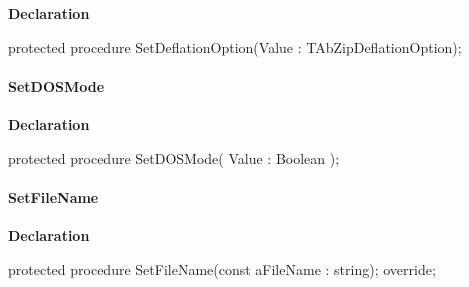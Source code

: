 \documentclass{report}
\newif\ifpdf
\begin{document}
\label{AbZipper.TAbCustomZipper-SetDeflationOption}
\begin{list}{}{
\setlength{\itemindent}{0cm}
\setlength{\listparindent}{0cm}
\setlength{\leftmargin}{\evensidemargin}
\addtolength{\leftmargin}{\tmplength}
\settowidth{\labelsep}{X}
\addtolength{\leftmargin}{\labelsep}
\setlength{\labelwidth}{\tmplength}
}
\item[\textbf{Declaration}\hfill]
\ifpdf
\begin{flushleft}
\fi
\begin{ttfamily}
protected procedure SetDeflationOption(Value : TAbZipDeflationOption);\end{ttfamily}

\ifpdf
\end{flushleft}
\fi

\end{list}
\paragraph*{SetDOSMode}\hspace*{\fill}

\label{AbZipper.TAbCustomZipper-SetDOSMode}
\begin{list}{}{
\setlength{\itemindent}{0cm}
\setlength{\listparindent}{0cm}
\setlength{\leftmargin}{\evensidemargin}
\addtolength{\leftmargin}{\tmplength}
\settowidth{\labelsep}{X}
\addtolength{\leftmargin}{\labelsep}
\setlength{\labelwidth}{\tmplength}
}
\item[\textbf{Declaration}\hfill]
\ifpdf
\begin{flushleft}
\fi
\begin{ttfamily}
protected procedure SetDOSMode( Value : Boolean );\end{ttfamily}

\ifpdf
\end{flushleft}
\fi

\end{list}
\paragraph*{SetFileName}\hspace*{\fill}

\label{AbZipper.TAbCustomZipper-SetFileName}
\begin{list}{}{
\setlength{\itemindent}{0cm}
\setlength{\listparindent}{0cm}
\setlength{\leftmargin}{\evensidemargin}
\addtolength{\leftmargin}{\tmplength}
\settowidth{\labelsep}{X}
\addtolength{\leftmargin}{\labelsep}
\setlength{\labelwidth}{\tmplength}
}
\item[\textbf{Declaration}\hfill]
\ifpdf
\begin{flushleft}
\fi
\begin{ttfamily}
protected procedure SetFileName(const aFileName : string); override;\end{ttfamily}

\ifpdf
\end{flushleft}
\fi

\end{list}
\end{document}

